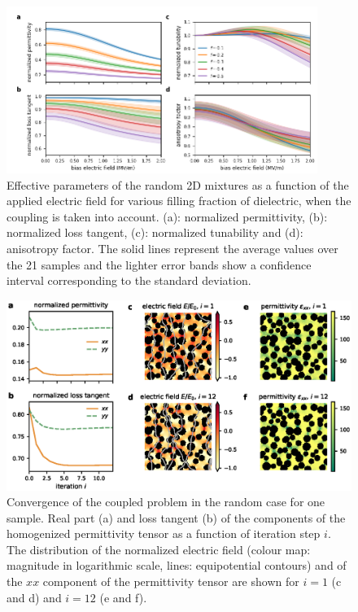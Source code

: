 \documentclass[openacc]{rsproca_new}%
\begin{document}
\begin{figure}[!t]
 \centering
 \includegraphics[width=0.9\textwidth]{effpar_rand_cpl}
 \caption{Effective parameters of the random 2D mixtures as a function of the
  applied electric field for various filling fraction of dielectric, when the
  coupling is taken into account.
  (a): normalized permittivity, (b): normalized loss tangent, (c): normalized tunability and
  (d): anisotropy factor. The solid lines represent the average values
  over the 21 samples and the lighter error bands show a confidence interval corresponding to
  the standard deviation.}
 \label{eff_par_2Drand_TM}
\end{figure}
%
%
%
\begin{figure}[!t]
 \centering
 \includegraphics[width=1\textwidth]{convergence_rand}
 \caption{Convergence of the coupled problem in the random case
  for one sample.
  Real part (a) and loss tangent (b) of the components of the homogenized
  permittivity tensor as a function of iteration step $i$. The distribution of
  the normalized electric field (colour map: magnitude in logarithmic scale,
  lines: equipotential contours) and of the $xx$ component of the permittivity tensor are shown for $i=1$
  (c and d) and $i=12$ (e and f).
 }
 \label{conv_random}
\end{figure}
\end{document}
